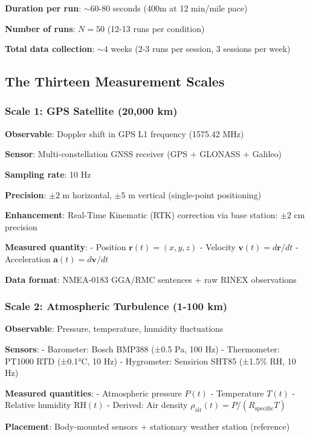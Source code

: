 \documentclass[11pt,onecolumn]{article}
\begin{document}
\textbf{Duration per run}: $\sim 60$-80 seconds (400m at 12 min/mile pace)

\textbf{Number of runs}: $N = 50$ (12-13 runs per condition)

\textbf{Total data collection}: $\sim 4$ weeks (2-3 runs per session, 3 sessions per week)

\subsection{The Thirteen Measurement Scales}

\subsubsection{Scale 1: GPS Satellite (20,000 km)}

\textbf{Observable}: Doppler shift in GPS L1 frequency (1575.42 MHz)

\textbf{Sensor}: Multi-constellation GNSS receiver (GPS + GLONASS + Galileo)

\textbf{Sampling rate}: 10 Hz

\textbf{Precision}: $\pm 2$ m horizontal, $\pm 5$ m vertical (single-point positioning)

\textbf{Enhancement}: Real-Time Kinematic (RTK) correction via base station: $\pm 2$ cm precision

\textbf{Measured quantity}:
- Position $\mathbf{r}(t) = (x, y, z)$
- Velocity $\mathbf{v}(t) = d\mathbf{r}/dt$
- Acceleration $\mathbf{a}(t) = d\mathbf{v}/dt$

\textbf{Data format}: NMEA-0183 GGA/RMC sentences + raw RINEX observations

\subsubsection{Scale 2: Atmospheric Turbulence (1-100 km)}

\textbf{Observable}: Pressure, temperature, humidity fluctuations

\textbf{Sensors}:
- Barometer: Bosch BMP388 (±0.5 Pa, 100 Hz)
- Thermometer: PT1000 RTD (±0.1°C, 10 Hz)
- Hygrometer: Sensirion SHT85 (±1.5\% RH, 10 Hz)

\textbf{Measured quantities}:
- Atmospheric pressure $P(t)$
- Temperature $T(t)$
- Relative humidity RH$(t)$
- Derived: Air density $\rho_{\text{air}}(t) = P/(R_{\text{specific}}T)$

\textbf{Placement}: Body-mounted sensors + stationary weather station (reference)
\end{document}
